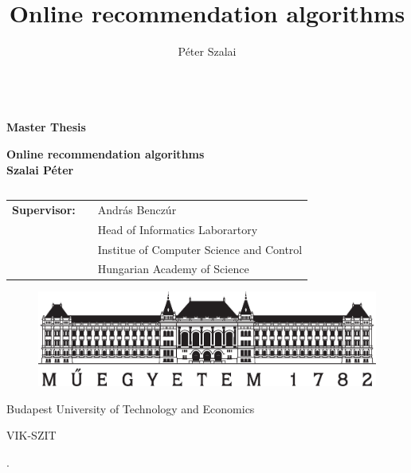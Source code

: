 \documentclass[a4paper,11pt,oneside,usenames,dvipsnames]{report}
\title{Online recommendation algorithms}
\author{P\'eter Szalai}
\begin{document}

\thispagestyle{empty}
\begin{center}

{ $\left. \right.$ \\ \vspace{0.5cm} \large \textbf{Master Thesis} \\ }
\vspace{2cm}

{ \large \textbf{Online recommendation algorithms} \\
\vspace{1cm}  
\textbf{Szalai P\'eter} \\ }
\vspace{2cm}

\begin{tabular}{c}

\end{tabular}

\begin{tabular}{l l l }
 {\bf Supervisor:} && Andr\'as Bencz\'ur  \\
                    && Head of Informatics Laborartory \\
                    && Institue of Computer Science and Control\\
                    && Hungarian Academy of Science
                    
\end{tabular}

\vspace*{2cm}


\begin{figure}[h]
\centering
\includegraphics[scale=.4]{tex/pic/bme_logo.eps}
\end{figure}
\vspace*{-.25cm}
\begin{center}
{\normalsize \rmfamily Budapest University of Technology and Economics}
\end{center}
\vspace*{-.5cm}
\begin{center}
{\normalsize \rmfamily VIK-SZIT}
\end{center}

\begin{center}
{\normalsize {}.}
\end{center} 

\end{center}
\newpage
\end{document}
